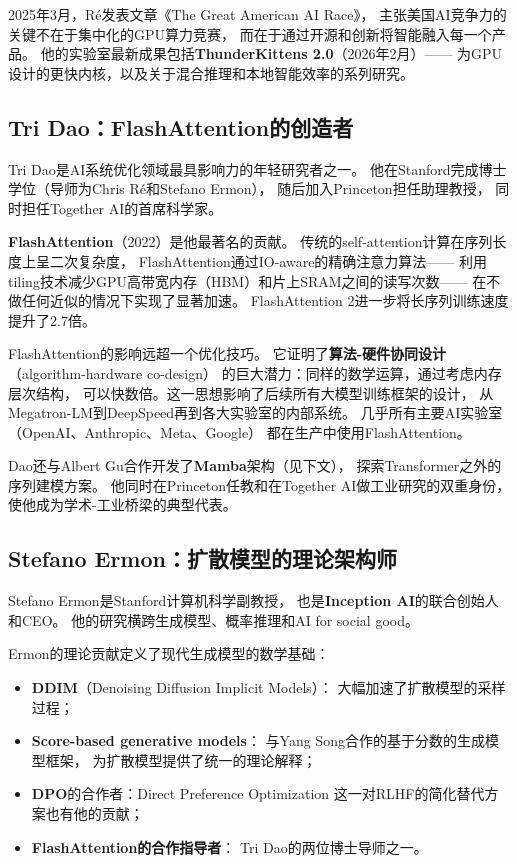 2025年3月，R\'{e}发表文章《The Great American AI Race》，
主张美国AI竞争力的关键不在于集中化的GPU算力竞赛，
而在于通过开源和创新将智能融入每一个产品。
他的实验室最新成果包括\textbf{ThunderKittens 2.0}（2026年2月）——
为GPU设计的更快内核，以及关于混合推理和本地智能效率的系列研究。

\subsection{Tri Dao：FlashAttention的创造者}

Tri Dao是AI系统优化领域最具影响力的年轻研究者之一。
他在Stanford完成博士学位（导师为Chris R\'{e}和Stefano Ermon），
随后加入Princeton担任助理教授，
同时担任Together AI的首席科学家。

\textbf{FlashAttention}（2022）是他最著名的贡献。
传统的self-attention计算在序列长度上呈二次复杂度，
FlashAttention通过IO-aware的精确注意力算法——
利用tiling技术减少GPU高带宽内存（HBM）和片上SRAM之间的读写次数——
在不做任何近似的情况下实现了显著加速。
FlashAttention 2进一步将长序列训练速度提升了2.7倍。

\begin{whybox}[为什么FlashAttention改变了一切？]
FlashAttention的影响远超一个优化技巧。
它证明了\textbf{算法-硬件协同设计}（algorithm-hardware co-design）
的巨大潜力：同样的数学运算，通过考虑内存层次结构，
可以快数倍。这一思想影响了后续所有大模型训练框架的设计，
从Megatron-LM到DeepSpeed再到各大实验室的内部系统。
几乎所有主要AI实验室（OpenAI、Anthropic、Meta、Google）
都在生产中使用FlashAttention。
\end{whybox}

Dao还与Albert Gu合作开发了\textbf{Mamba}架构（见下文），
探索Transformer之外的序列建模方案。
他同时在Princeton任教和在Together AI做工业研究的双重身份，
使他成为学术-工业桥梁的典型代表。

\subsection{Stefano Ermon：扩散模型的理论架构师}

Stefano Ermon是Stanford计算机科学副教授，
也是\textbf{Inception AI}的联合创始人和CEO。
他的研究横跨生成模型、概率推理和AI for social good。

Ermon的理论贡献定义了现代生成模型的数学基础：

\begin{itemize}[noitemsep]
  \item \textbf{DDIM}（Denoising Diffusion Implicit Models）：
        大幅加速了扩散模型的采样过程；
  \item \textbf{Score-based generative models}：
        与Yang Song合作的基于分数的生成模型框架，
        为扩散模型提供了统一的理论解释；
  \item \textbf{DPO}的合作者：Direct Preference Optimization
        这一对RLHF的简化替代方案也有他的贡献；
  \item \textbf{FlashAttention的合作指导者}：
        Tri Dao的两位博士导师之一。
\end{itemize}

